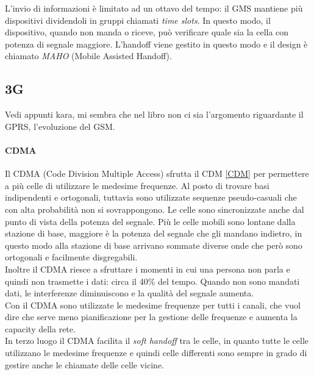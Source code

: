 \documentclass{article}
\begin{document}
L'invio di informazioni è limitato ad un ottavo del tempo: il GMS
mantiene più dispositivi dividendoli in gruppi chiamati \textit{time slots}. In
questo modo, il dispositivo, quando non manda o riceve, può verificare quale sia
la cella con potenza di segnale maggiore. L'handoff viene gestito in questo modo
e il design è chiamato \textit{MAHO} (Mobile Assisted Handoff).

\subsection{3G}
Vedi appunti kara, mi sembra che nel libro non ci sia l'argomento riguardante il
GPRS, l'evoluzione del GSM.

\paragraph{CDMA}
Il CDMA (Code Division Multiple Access) sfrutta il CDM \ref{CDM} per permettere
a più celle di utilizzare le medesime frequenze. Al posto di trovare basi
indipendenti e ortogonali, tuttavia sono utilizzate sequenze pseudo-casuali che
con alta probabilità non si sovrappongono. Le celle sono sincronizzate
anche dal punto di vista della potenza del segnale. Più le celle mobili sono
lontane dalla stazione di base, maggiore è la potenza del segnale che gli
mandano indietro, in questo modo alla stazione di base arrivano sommate diverse
onde che però sono ortogonali e facilmente disgregabili.\\
Inoltre il CDMA riesce a sfruttare i momenti in cui una persona non parla e
quindi non trasmette i dati: circa il 40\% del tempo. Quando non sono mandati
dati, le interferenze diminuiscono e la qualità del segnale aumenta.\\
Con il CDMA sono utilizzate le medesime frequenze per tutti i canali, che vuol
dire che serve meno pianificazione per la gestione delle frequenze e aumenta la
capacity della rete.\\
In terzo luogo il CDMA facilita il \textit{soft handoff} tra le celle, in quanto
tutte le celle utilizzano le medesime frequenze e quindi celle differenti sono
sempre in grado di gestire anche le chiamate delle celle vicine.
\end{document}
